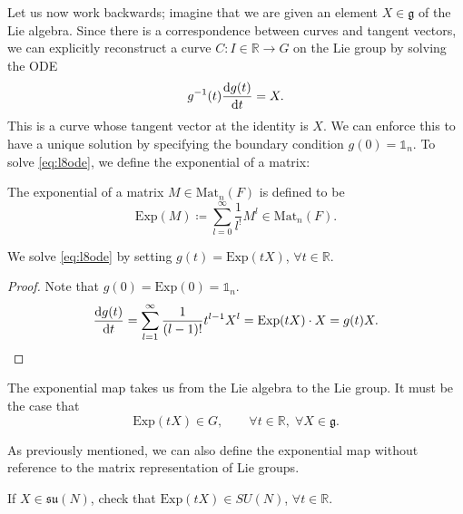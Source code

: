 \begin{wrapfigure}{L}{0.25\columnwidth}
  \centering
  \def\svgwidth{0.2\columnwidth}
  
  \caption{}
  \label{fig:l8f5}
\end{wrapfigure}
Let us now work backwards; imagine that we are given an element $X \in \mathfrak{g}$ of the Lie algebra.
Since there is a correspondence between curves and tangent vectors, we can explicitly reconstruct a curve $C \colon I \in \mathbb{R} \to G$ on the Lie group by solving the ODE
\begin{equation}
  \label{eq:l8ode}
  g^{-1}(t) \dv{g(t)}{t} = X.
\end{equation}
This is a curve whose tangent vector at the identity is $X$.
We can enforce this to have a unique solution by specifying the boundary condition $g(0) = \mathbb{1}_n$.
To solve \eqref{eq:l8ode}, we define the exponential of a matrix:
\begin{definition}[]
  The exponential of a matrix $M \in \text{Mat}_n(F)$ is defined to be
  \begin{equation}
    \text{Exp}(M) \coloneqq \sum_{l =0}^{\infty} \frac{1}{l^!} M^l \in \text{Mat}_n(F).
  \end{equation}
\end{definition}
\begin{claim}
  We solve \eqref{eq:l8ode} by setting $g(t) = \text{Exp}(t X)$, $\forall t \in \mathbb{R}.$
\end{claim}
\begin{proof}
  Note that $g(0) = \text{Exp}(0) = \mathbb{1}_n$.
  \begin{equation}
    \dv{g(t)}{t} = \sum_{l = 1}^\infty \frac{1}{(l-1)!} t^{l-1} X^l = \text{Exp}(t X) \cdot X = g(t) X.
  \end{equation}
\end{proof}
The exponential map takes us from the Lie algebra to the Lie group.
It must be the case that
\begin{equation}
  \text{Exp}(t X) \in G, \qquad \forall t \in \mathbb{R},\; \forall X \in \mathfrak{g}.
\end{equation}
\begin{leftbar}
  \begin{remark}
    As previously mentioned, we can also define the exponential map without reference to the matrix representation of Lie groups.
  \end{remark}
\end{leftbar}

\begin{exercise}
  If $X \in \mathfrak{su}(N)$, check that $\text{Exp}(t X) \in SU(N)$, $\forall t \in \mathbb{R}$.
\end{exercise}

